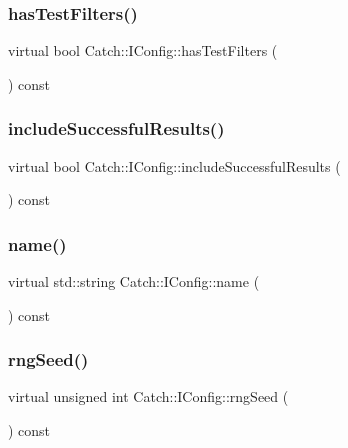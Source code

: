 \subsubsection{hasTestFilters()}
{\footnotesize\ttfamily virtual bool Catch\+::\+I\+Config\+::has\+Test\+Filters (\begin{DoxyParamCaption}{ }\end{DoxyParamCaption}) const\hspace{0.3cm}{\ttfamily [pure virtual]}}

\mbox{\label{struct_catch_1_1_i_config_a2f1b0391019b9ce69921527a684eab23}} 
\subsubsection{includeSuccessfulResults()}
{\footnotesize\ttfamily virtual bool Catch\+::\+I\+Config\+::include\+Successful\+Results (\begin{DoxyParamCaption}{ }\end{DoxyParamCaption}) const\hspace{0.3cm}{\ttfamily [pure virtual]}}

\mbox{\label{struct_catch_1_1_i_config_aa2315800a05c19db71518b1edc39d43b}} 
\subsubsection{name()}
{\footnotesize\ttfamily virtual std\+::string Catch\+::\+I\+Config\+::name (\begin{DoxyParamCaption}{ }\end{DoxyParamCaption}) const\hspace{0.3cm}{\ttfamily [pure virtual]}}

\mbox{\label{struct_catch_1_1_i_config_ae049eb45979d841073fa65d1094c7f14}} 
\subsubsection{rngSeed()}
{\footnotesize\ttfamily virtual unsigned int Catch\+::\+I\+Config\+::rng\+Seed (\begin{DoxyParamCaption}{ }\end{DoxyParamCaption}) const\hspace{0.3cm}{\ttfamily [pure virtual]}}


